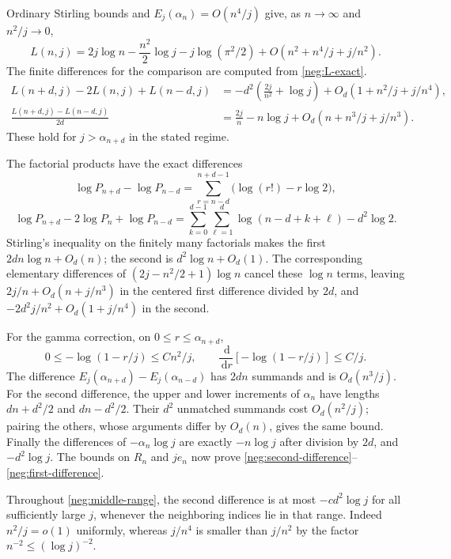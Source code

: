 \documentclass[11pt]{article}
\numberwithin{equation}{section}
\theoremstyle{definition}
\newcommand{\dd}{\,\mathrm d}
\begin{document}
Ordinary Stirling bounds and
\(E_j(\alpha_n)=O(n^4/j)\) give, as \(n\to\infty\) and
\(n^2/j\to0\),
\begin{equation}
 L(n,j)=2j\log n-\frac{n^2}{2}\log j-j\log(\pi^2/2)
       +O(n^2+n^4/j+j/n^2).
 \label{neg:L-asymptotic}
\end{equation}
The finite differences for the comparison are computed from
\eqref{neg:L-exact}.
\begin{align}
 L(n+d,j)-2L(n,j)+L(n-d,j)
  &=-d^2\left(\frac{2j}{n^2}+\log j\right)
       +O_d(1+n^2/j+j/n^4),\label{neg:second-difference}\\
 \frac{L(n+d,j)-L(n-d,j)}{2d}
  &=\frac{2j}{n}-n\log j+O_d(n+n^3/j+j/n^3).
       \label{neg:first-difference}
\end{align}
These hold for \(j>\alpha_{n+d}\) in the stated regime.

The factorial products have the exact differences
\[
 \log P_{n+d}-\log P_{n-d}
  =\sum_{r=n-d}^{n+d-1}\bigl(\log(r!)-r\log2\bigr),
\]
\[
 \log P_{n+d}-2\log P_n+\log P_{n-d}
  =\sum_{k=0}^{d-1}\sum_{\ell=1}^d\log(n-d+k+\ell)-d^2\log2.
\]
Stirling's inequality on the finitely many factorials makes the
first \(2dn\log n+O_d(n)\); the second is
\(d^2\log n+O_d(1)\).  The corresponding elementary differences
of \((2j-n^2/2+1)\log n\) cancel these \(\log n\) terms, leaving
\(2j/n+O_d(n+j/n^3)\) in the centered first difference divided
by \(2d\), and \(-2d^2j/n^2+O_d(1+j/n^4)\) in the second.

For the gamma correction, on \(0\le r\le\alpha_{n+d}\),
\[
 0\le-\log(1-r/j)\le Cn^2/j,\qquad
 \frac{\dd}{\dd r}[-\log(1-r/j)]\le C/j.
\]
The difference \(E_j(\alpha_{n+d})-E_j(\alpha_{n-d})\) has
\(2dn\) summands and is \(O_d(n^3/j)\).  For the second
difference, the upper and lower increments of \(\alpha_n\) have
lengths \(dn+d^2/2\) and \(dn-d^2/2\).  Their \(d^2\) unmatched
summands cost \(O_d(n^2/j)\); pairing the others, whose arguments
differ by \(O_d(n)\), gives the same bound.  Finally the differences
of \(-\alpha_n\log j\) are exactly \(-n\log j\) after division
by \(2d\), and \(-d^2\log j\).  The bounds on \(R_n\) and
\(je_n\) now prove \eqref{neg:second-difference}--
\eqref{neg:first-difference}.

Throughout \eqref{neg:middle-range}, the second difference is at
most \(-cd^2\log j\) for all sufficiently large \(j\), whenever
the neighboring indices lie in that range.  Indeed \(n^2/j=o(1)\)
uniformly, whereas \(j/n^4\) is smaller than \(j/n^2\) by the
factor \(n^{-2}\le(\log j)^{-2}\).
\end{document}
